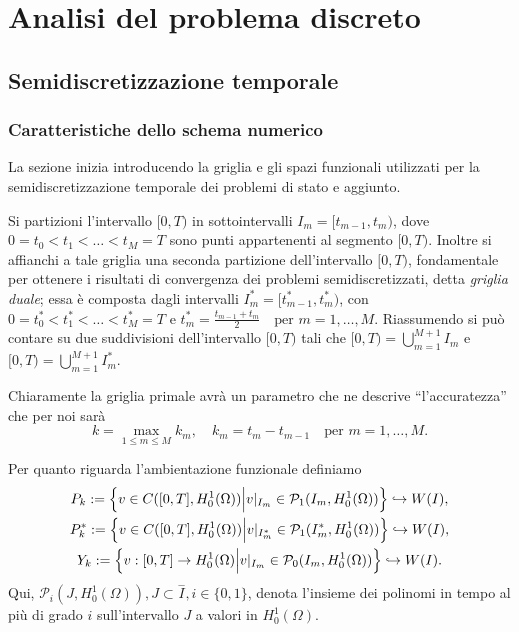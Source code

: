 \chapter{Analisi del problema discreto}
\label{chap:Discontinuos}

\section{Semidiscretizzazione temporale}

\subsection{Caratteristiche dello schema numerico}
La sezione inizia introducendo la griglia e gli spazi funzionali utilizzati per la semidiscretizzazione temporale dei problemi di stato e aggiunto.

Si partizioni l'intervallo $[0,T)$ in sottointervalli $I_m=[t_{m-1},t_m)$, dove $0=t_0<t_1<\dots<t_M=T$ sono punti appartenenti al segmento $[0,T)$. Inoltre si affianchi a tale griglia una seconda partizione dell'intervallo $[0,T)$, fondamentale per ottenere i risultati di convergenza dei problemi semidiscretizzati, detta \textit{griglia duale}; essa è composta dagli intervalli $I^*_m=[t^*_{m-1},t^*_m)$, con $0=t^*_0<t^*_1<\dots<t^*_M=T$ e $t^*_m=\frac{t_{m-1}+t_m}{2}\quad\text{per $m=1,\dots,M$}$. Riassumendo si può contare su due suddivisioni dell'intervallo $[0,T)$ tali che $[0,T)=\bigcup^{M+1}_{m=1} I_m$ e $[0,T)=\bigcup^{M+1}_{m=1} I^*_m$.

Chiaramente la griglia primale avrà un parametro che ne descrive ``l'accuratezza'' che per noi sarà 
\[
k=\max_{1\le m\le M} k_m,\quad k_m=t_m-t_{m-1}\quad\text{per $m=1,\dots,M$}.
\] 

Per quanto riguarda l'ambientazione funzionale definiamo 
\begin{gather*}
P_k:=\Bigl\{v\in C([0,T],H^1_0(\Omega))\Bigl| v|_{I_{m}}\in \mathcal{P}_1(I_m,H^1_0(\Omega))\Bigr\}\hookrightarrow W(I),\\
P^*_k:=\Bigl\{v\in C([0,T],H^1_0(\Omega))\Bigl| v|_{I^*_{m}}\in \mathcal{P}_1(I^*_m,H^1_0(\Omega))\Bigr\}\hookrightarrow W(I),\\  
  Y_k:=\Bigl\{v:[0,T]\to H^1_0(\Omega)\Bigl| v|_{I_{m}}\in \mathcal{P}_0(I_m,H^1_0(\Omega))\Bigr\}\hookrightarrow W(I).
\end{gather*}
Qui, $\mathcal{P}_i(J,H^1_0(\Omega)), J\subset \overset{-}{I}, i\in\{0,1\}$, denota l'insieme dei polinomi in tempo al più di grado $i$ sull'intervallo $J$ a valori in $H^1_0(\Omega)$.


